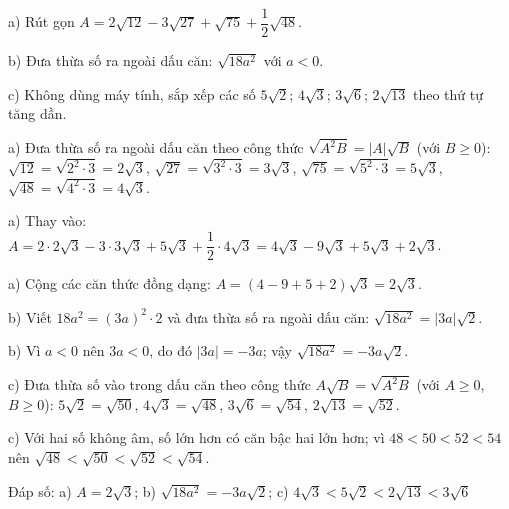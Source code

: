 \begin{problem}[9DS-CAN-004]
a) Rút gọn $A = 2\sqrt{12} - 3\sqrt{27} + \sqrt{75} + \dfrac{1}{2}\sqrt{48}$.

b) Đưa thừa số ra ngoài dấu căn: $\sqrt{18a^2}$ với $a < 0$.

c) Không dùng máy tính, sắp xếp các số $5\sqrt{2}$; $4\sqrt{3}$; $3\sqrt{6}$; $2\sqrt{13}$ theo thứ tự tăng dần.

\begin{solution}
a) Đưa thừa số ra ngoài dấu căn theo công thức $\sqrt{A^2 B} = |A|\sqrt{B}$ (với $B \geq 0$): $\sqrt{12} = \sqrt{2^2 \cdot 3} = 2\sqrt{3}$, $\sqrt{27} = \sqrt{3^2 \cdot 3} = 3\sqrt{3}$, $\sqrt{75} = \sqrt{5^2 \cdot 3} = 5\sqrt{3}$, $\sqrt{48} = \sqrt{4^2 \cdot 3} = 4\sqrt{3}$.

a) Thay vào: $A = 2 \cdot 2\sqrt{3} - 3 \cdot 3\sqrt{3} + 5\sqrt{3} + \dfrac{1}{2} \cdot 4\sqrt{3} = 4\sqrt{3} - 9\sqrt{3} + 5\sqrt{3} + 2\sqrt{3}$.

a) Cộng các căn thức đồng dạng: $A = (4 - 9 + 5 + 2)\sqrt{3} = 2\sqrt{3}$.

b) Viết $18a^2 = (3a)^2 \cdot 2$ và đưa thừa số ra ngoài dấu căn: $\sqrt{18a^2} = |3a|\sqrt{2}$.

b) Vì $a < 0$ nên $3a < 0$, do đó $|3a| = -3a$; vậy $\sqrt{18a^2} = -3a\sqrt{2}$.

c) Đưa thừa số vào trong dấu căn theo công thức $A\sqrt{B} = \sqrt{A^2 B}$ (với $A \geq 0$, $B \geq 0$): $5\sqrt{2} = \sqrt{50}$, $4\sqrt{3} = \sqrt{48}$, $3\sqrt{6} = \sqrt{54}$, $2\sqrt{13} = \sqrt{52}$.

c) Với hai số không âm, số lớn hơn có căn bậc hai lớn hơn; vì $48 < 50 < 52 < 54$ nên $\sqrt{48} < \sqrt{50} < \sqrt{52} < \sqrt{54}$.

Đáp số: a) $\boxed{A = 2\sqrt{3}}$; b) $\boxed{\sqrt{18a^2} = -3a\sqrt{2}}$; c) $\boxed{4\sqrt{3} < 5\sqrt{2} < 2\sqrt{13} < 3\sqrt{6}}$
\end{solution}
\end{problem}

